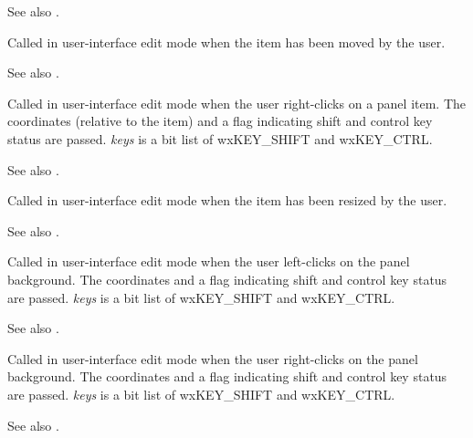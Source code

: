 See also .



Called in user-interface edit mode when the item has been moved by the user.

See also .



Called in user-interface edit mode when the user right-clicks on a panel item.
The coordinates (relative to the item) and a flag indicating shift and control
key status are passed. {\it keys} is a bit list of wxKEY\_SHIFT and wxKEY\_CTRL.

See also .



Called in user-interface edit mode when the item has been resized by the user.

See also .



Called in user-interface edit mode when the user left-clicks on the
panel background. The coordinates and a flag indicating shift and control
key status are passed. {\it keys} is a bit list of wxKEY\_SHIFT and wxKEY\_CTRL.

See also .



Called in user-interface edit mode when the user right-clicks on the
panel background. The coordinates and a flag indicating shift and control
key status are passed. {\it keys} is a bit list of wxKEY\_SHIFT and wxKEY\_CTRL.

See also .


